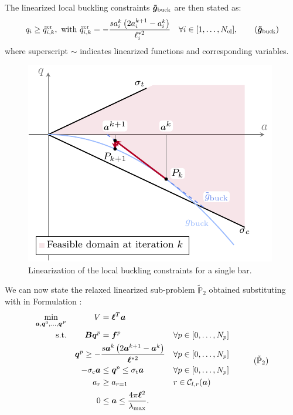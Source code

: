 The linearized local buckling constraints $\bm{\tilde{g}}_{\textrm{buck}}$ are then stated as:
\begin{equation}
    q_{i} \geq \tilde{q}^{\text{cr}}_{i,k},\text{ with } \tilde{q}^{\text{cr}}_{i,k}= - \frac{s a_{i}^k\left(2 a_{i}^{k+1} - a_{i}^k\right)}{\ell^{*2}_i} \quad \forall i \in [1,\ldots, N_{\text{el}}],
    \label{eq:04_buck_con_lin}
    \tag{$\vect{\tilde{g}}_{\textrm{buck}}$}
\end{equation}
where superscript $\sim$ indicates linearized functions and corresponding variables.

\begin{figure}
    \centering
    \includegraphics[width=0.7\linewidth]{figures/04_TTO_improvements/03_SLP/slp.pdf}
    \caption{Linearization of the local buckling constraints for a single bar.}
    \label{fig:04_SLP}
\end{figure}


We can now state the relaxed linearized sub-problem $\tilde{\mathbb{P}}_2$ obtained substituting  with  in Formulation :
\begin{equation}
    \begin{aligned}
    \min_{\vect{a}, \vect{q}^0, \dots, \vect{q}^P}   && V &= \vect{\ell}^{T}\vect{a}\\
    \textrm{s.t.}   && \matr{B}\vect{q}^p &= \vect{f}^p && \forall p \in [0,\dots,N_p]\\
    && \vect{q}^p \geq - &\frac{s \vect{a}^k\left(2 \vect{a}^{k+1} - \vect{a}^k\right)}{\vect{\ell}^{*2}} && \forall p \in [0,\dots,N_p] \\
    && -\sigma_\text{c}\vect{a} &\leq \vect{q}^p \leq \sigma_\text{t}\vect{a} && \forall p \in [0,\dots,N_p] \\
    && a_{r}&\geq a_{r=1} && r \in \mathcal{C}_{l,r}(\vect{a}) \\
    && 0 &\leq \vect{a} \leq \frac{4 \pi \vect{\ell}^2}{\lambda_{\text{max}}}. \\
    \end{aligned}
    \tag{$\tilde{\mathbb{P}}_2$}
    \label{eq:04_optim_no_constr_lp}
\end{equation}

